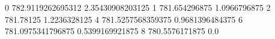0 782.9119262695312 2.35430908203125
1 781.654296875 1.0966796875
2 781.78125 1.2236328125
4 781.5257568359375 0.9681396484375
6 781.0975341796875 0.5399169921875
8 780.5576171875 0.0

